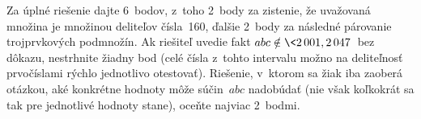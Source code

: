 {%
%

\nobreak\medskip\petit\noindent
Za úplné riešenie dajte 6~bodov, z~toho 2~body za zistenie, že
uvažovaná množina je množinou deliteľov čísla~160, ďalšie 2~body
za následné párovanie trojprvkových podmnožín. Ak riešiteľ uvedie
fakt $abc\notin\<2\,001,2\,047\>$ bez dôkazu, nestrhnite žiadny bod
(celé čísla z~tohto intervalu možno na deliteľnosť prvočíslami rýchlo
jednotlivo otestovať). Riešenie, v~ktorom sa žiak iba zaoberá
otázkou, aké konkrétne hodnoty môže súčin~$abc$ nadobúdať (nie
však koľkokrát sa tak pre jednotlivé hodnoty stane), oceňte
najviac 2~bodmi.

\endpetit
\bigbreak
}


